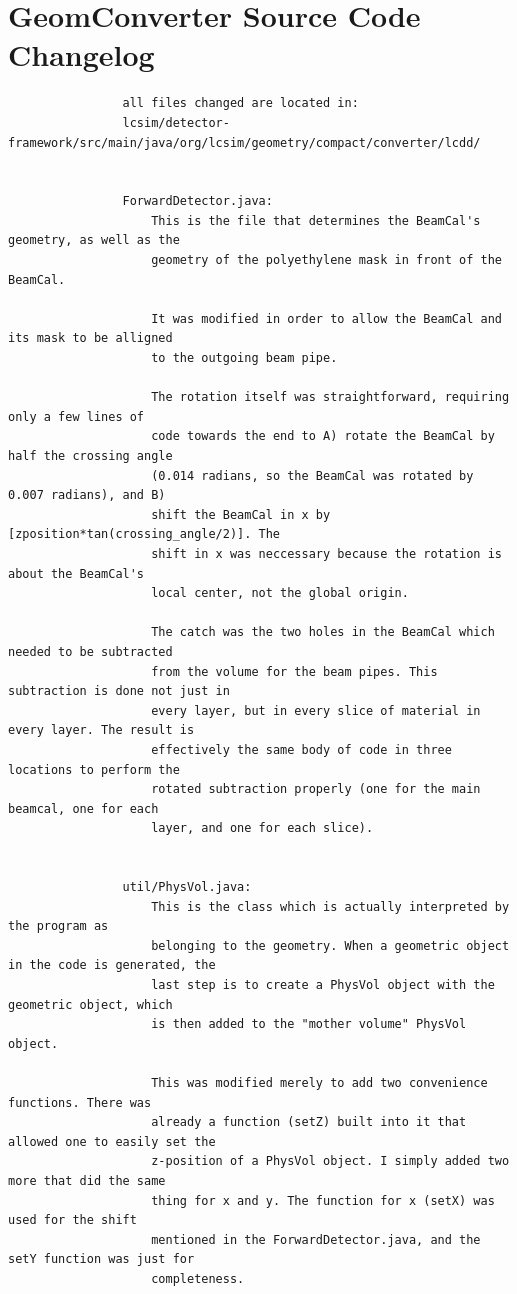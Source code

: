 \documentclass{report}
\begin{document}
        \section{GeomConverter Source Code Changelog} \label{sect__geom_changes}
            \begin{verbatim}
                all files changed are located in:
                lcsim/detector-framework/src/main/java/org/lcsim/geometry/compact/converter/lcdd/


                ForwardDetector.java:
                    This is the file that determines the BeamCal's geometry, as well as the
                    geometry of the polyethylene mask in front of the BeamCal.
                    
                    It was modified in order to allow the BeamCal and its mask to be alligned
                    to the outgoing beam pipe.
                    
                    The rotation itself was straightforward, requiring only a few lines of
                    code towards the end to A) rotate the BeamCal by half the crossing angle
                    (0.014 radians, so the BeamCal was rotated by 0.007 radians), and B) 
                    shift the BeamCal in x by [zposition*tan(crossing_angle/2)]. The
                    shift in x was neccessary because the rotation is about the BeamCal's
                    local center, not the global origin. 

                    The catch was the two holes in the BeamCal which needed to be subtracted
                    from the volume for the beam pipes. This subtraction is done not just in
                    every layer, but in every slice of material in every layer. The result is
                    effectively the same body of code in three locations to perform the
                    rotated subtraction properly (one for the main beamcal, one for each
                    layer, and one for each slice). 


                util/PhysVol.java:
                    This is the class which is actually interpreted by the program as
                    belonging to the geometry. When a geometric object in the code is generated, the
                    last step is to create a PhysVol object with the geometric object, which
                    is then added to the "mother volume" PhysVol object.

                    This was modified merely to add two convenience functions. There was
                    already a function (setZ) built into it that allowed one to easily set the
                    z-position of a PhysVol object. I simply added two more that did the same
                    thing for x and y. The function for x (setX) was used for the shift
                    mentioned in the ForwardDetector.java, and the setY function was just for
                    completeness.



\end{verbatim}
\end{document}
